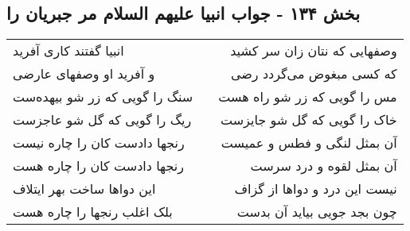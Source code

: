 \begin{center}
\section*{بخش ۱۳۴ - جواب انبیا علیهم السلام مر جبریان را}
\label{sec:sh134}
\begin{longtable}{l p{0.5cm} r}
انبیا گفتند کاری آفرید
&&
وصفهایی که نتان زان سر کشید
\\
و آفرید او وصفهای عارضی
&&
که کسی مبغوض می‌گردد رضی
\\
سنگ را گویی که زر شو بیهده‌ست
&&
مس را گویی که زر شو راه هست
\\
ریگ را گویی که گل شو عاجزست
&&
خاک را گویی که گل شو جایزست
\\
رنجها دادست کان را چاره نیست
&&
آن بمثل لنگی و فطس و عمیست
\\
رنجها دادست کان را چاره هست
&&
آن بمثل لقوه و درد سرست
\\
این دواها ساخت بهر ایتلاف
&&
نیست این درد و دواها از گزاف
\\
بلک اغلب رنجها را چاره هست
&&
چون بجد جویی بیاید آن بدست
\\
\end{longtable}
\end{center}
